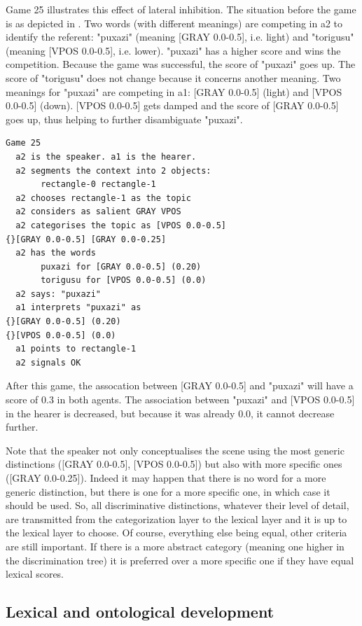 Game 25 illustrates this effect of 
lateral inhibition. The situation before the game is 
as depicted in . 
Two words (with different meanings) are competing in {\bfshape  a2} to 
identify the referent: "puxazi" (meaning 
{}[GRAY 0.0-0.5], i.e. light) and "torigusu"
(meaning [VPOS 0.0-0.5], i.e. lower).  "puxazi" has
a higher score and wins the competition. Because the game 
was successful, the score
of "puxazi" goes up. The score of "torigusu" 
does not change because it concerns another 
meaning. Two meanings for "puxazi"
are competing in {\bfshape  a1}: [GRAY 0.0-0.5] (light)
and [VPOS 0.0-0.5] (down). [VPOS 0.0-0.5] gets damped and 
the score of [GRAY 0.0-0.5] goes up, thus helping to 
further disambiguate "puxazi". 
\begin{verbatim}
Game 25
  a2 is the speaker. a1 is the hearer. 
  a2 segments the context into 2 objects: 
       rectangle-0 rectangle-1 
  a2 chooses rectangle-1 as the topic 
  a2 considers as salient GRAY VPOS
  a2 categorises the topic as [VPOS 0.0-0.5] 
{}[GRAY 0.0-0.5] [GRAY 0.0-0.25]
  a2 has the words
       puxazi for [GRAY 0.0-0.5] (0.20)
       torigusu for [VPOS 0.0-0.5] (0.0)
  a2 says: "puxazi"
  a1 interprets "puxazi" as
{}[GRAY 0.0-0.5] (0.20)
{}[VPOS 0.0-0.5] (0.0)
  a1 points to rectangle-1
  a2 signals OK
\end{verbatim}
After this game, the assocation between [GRAY 0.0-0.5] 
and "puxazi" will have a score of 0.3 in both agents. 
The association between "puxazi" and [VPOS 0.0-0.5] 
in the hearer is decreased, but because it was already 
0.0, it cannot decrease further. 

Note that the speaker not only conceptualises the scene using 
the most generic distinctions ([GRAY 0.0-0.5], 
{}[VPOS 0.0-0.5]) but also
with more specific ones ([GRAY 0.0-0.25]). Indeed it 
may happen that there is no word for a more generic 
distinction, but there is one for a more specific 
one, in which case it should be used. 
So, all discriminative distinctions, 
whatever their level of detail, are
transmitted from the categorization layer to the 
lexical layer and it is up to the lexical layer
to choose. Of course, everything else being equal, 
other criteria are still important. If there is a 
more abstract category (meaning one higher in the 
discrimination tree) it is preferred over a more 
specific one if they have equal lexical scores. 

\subsection{Lexical and ontological development} 

